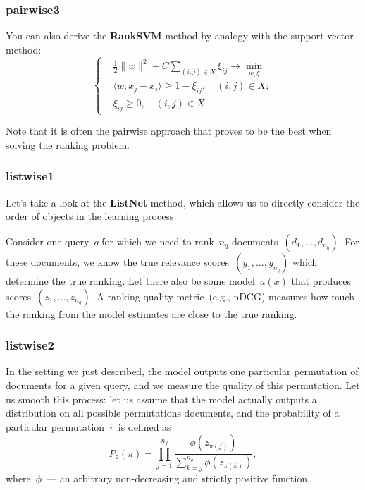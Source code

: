 \documentclass{beamer}
\begin{document}
\begin{frame}
\frametitle{pairwise3}

You can also derive the \textbf{RankSVM} method by analogy with the support vector method:
\[
    \left\{
    \begin{aligned}
        &\frac{1}{2} \|w\|^2 + C \sum_{(i, j) \in X} \xi_{ij} \to \min_{w, \xi}\\
        &\langle w, x_j - x_i \rangle \geq 1 - \xi_{ij}, \quad (i, j) \in X;\\
        &\xi_{ij} \geq 0, \quad (i, j) \in X.
    \end{aligned}
    \right.
\]

Note that it is often the pairwise approach that proves to be the best when solving the ranking problem.
\end{frame}



\begin{frame}
\frametitle{listwise1}

Let's take a look at the \textbf{ListNet} method, which allows us to directly consider the order
of objects in the learning process.

Consider one query~$q$ for which we need to rank~$n_q$ documents~$(d_1, \dots, d_{n_q})$.
For these documents, we know the true relevance scores~$(y_1, \dots, y_{n_q})$
which determine the true ranking.
Let there also be some model~$a(x)$ that produces scores~$(z_1, \dots, z_{n_q})$.
A ranking quality metric~(e.g., nDCG) measures how much the ranking from the model estimates
are close to the true ranking.
\end{frame}


\begin{frame}
\frametitle{listwise2}

In the setting we just described, the model outputs one particular permutation of documents for a given
query, and we measure the quality of this permutation.
Let us smooth this process: let us assume that the model actually outputs a distribution on all possible permutations
documents, and the probability of a particular permutation~$\pi$ is defined as
\[
    P_z(\pi)
    =
    \prod_{j = 1}^{n_q}
        \frac{
            \phi(z_{\pi(j)})
        }{
            \sum_{k = j}^{n_q}
                \phi(z_{\pi(k)})
        },
\]
where~$\phi$~--- an arbitrary non-decreasing and strictly positive function.
\end{frame}
\end{document}
